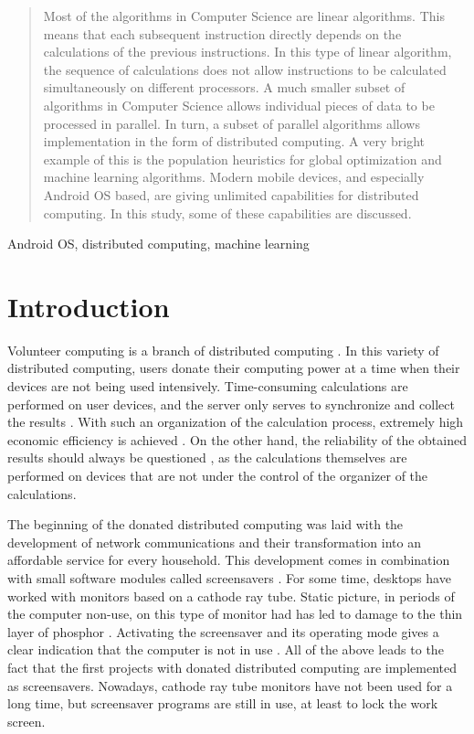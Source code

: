 \documentclass[a4paper,conference]{IEEEtran}
\begin{document}
\maketitle

\begin{abstract}
Most of the algorithms in Computer Science are linear algorithms. This means that each subsequent instruction directly depends on the calculations of the previous instructions. In this type of linear algorithm, the sequence of calculations does not allow instructions to be calculated simultaneously on different processors. A much smaller subset of algorithms in Computer Science allows individual pieces of data to be processed in parallel. In turn, a subset of parallel algorithms allows implementation in the form of distributed computing. A very bright example of this is the population heuristics for global optimization and machine learning algorithms. Modern mobile devices, and especially Android OS based, are giving unlimited capabilities for distributed computing. In this study, some of these capabilities are discussed.
\end{abstract}

\begin{IEEEkeywords}
Android OS, distributed computing, machine learning
\end{IEEEkeywords}

\section{Introduction}

Volunteer computing \cite{Durrani-01} is a branch of distributed computing \cite{Lamport-01}. In this variety of distributed computing, users donate their computing power at a time when their devices are not being used intensively. Time-consuming calculations \cite{Meyerov-01} are performed on user devices, and the server only serves to synchronize and collect the results \cite{Geng-01}. With such an organization of the calculation process, extremely high economic efficiency is achieved \cite{Guler-01}. On the other hand, the reliability of the obtained results should always be questioned \cite{Heien-01}, as the calculations themselves are performed on devices that are not under the control of the organizer of the calculations. 

The beginning of the donated distributed computing was laid with the development of network communications and their transformation into an affordable service for every household. This development comes in combination with small software modules called screensavers \cite{Krieger-01}. For some time, desktops have worked with monitors based on a cathode ray tube. Static picture, in periods of the computer non-use, on this type of monitor had has led to damage to the thin layer of phosphor \cite{Pfahnl-01}. Activating the screensaver and its operating mode gives a clear indication that the computer is not in use \cite{Forcier-01}. All of the above leads to the fact that the first projects with donated distributed computing are implemented as screensavers. Nowadays, cathode ray tube monitors have not been used for a long time, but screensaver programs are still in use, at least to lock the work screen. 
\end{document}
